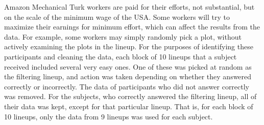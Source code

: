\documentclass[12pt]{article}
\begin{document}
Amazon Mechanical Turk workers are paid for their efforts, not substantial, but on the scale of the minimum wage of the USA. Some workers will try to maximize their earnings for minimum effort, which can affect the results from the data. For example, some workers may simply randomly pick a plot, without actively examining the plots in the lineup. For the purposes of identifying these participants and cleaning the data, each block of 10 lineups that a subject received included several very easy ones. One of these was picked at random as the filtering lineup, and action was taken depending on whether they answered correctly or incorrectly. The data of participants who did not answer correctly was removed. For the subjects, who correctly answered the filtering lineup, all of their data was kept, except for that particular lineup. That is, for each block of 10 lineups, only the data from 9 lineups was used for each subject.

\end{document}
